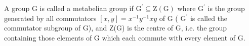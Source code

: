 A group G is called a metabelian group if $ \mathrm{G} ^{\prime} \subseteq \mathrm{Z(G)} $
where $ \mathrm{G} ^{\prime} $ is the group generated by all commutators $[x,y]=x^{-1}y^{-1}xy$  of G ( $ \mathrm{G} ^{\prime} $ is called the commutator
subgroup of G), and Z(G) is the centre of G, i.e. the group containing those elements
of G which each commute with every element of G.